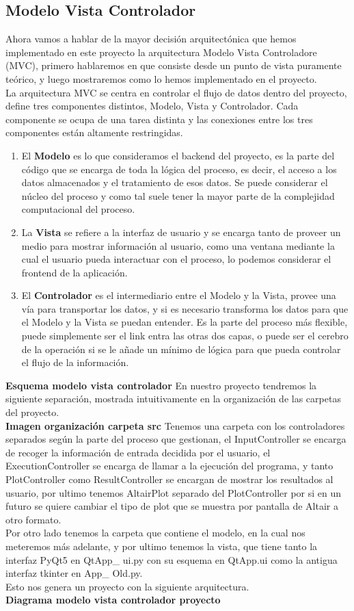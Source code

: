 \documentclass[12pt,a4paper]{article}
\begin{document}
	\subsection{Modelo Vista Controlador}
	Ahora vamos a hablar de la mayor decisión arquitectónica que hemos implementado en este proyecto la arquitectura Modelo Vista Controladore (MVC), primero hablaremos en que consiste desde un punto de vista puramente teórico, y luego mostraremos como lo hemos implementado en el proyecto.\\
	La arquitectura MVC se centra en controlar el flujo de datos dentro del proyecto, define tres componentes distintos, Modelo, Vista y Controlador. Cada componente se ocupa de una tarea distinta y las conexiones entre los tres componentes están altamente restringidas.
	\begin{enumerate}
	\item El \textbf{Modelo} es lo que consideramos el backend del proyecto, es la parte del código que se encarga de toda la lógica del proceso, es decir, el acceso a los datos almacenados y el tratamiento de esos datos. Se puede considerar el núcleo del proceso y como tal suele tener la mayor parte de la complejidad computacional del proceso.
	\item La \textbf{Vista} se refiere a la interfaz de usuario y se encarga tanto de proveer un medio para mostrar información al usuario, como una ventana mediante la cual el usuario pueda interactuar con el proceso, lo podemos considerar el frontend de la aplicación.
	\item El \textbf{Controlador} es el intermediario entre el Modelo y la Vista, provee una vía para transportar los datos, y si es necesario transforma los datos para que el Modelo y la Vista se puedan entender. Es la parte del proceso más flexible, puede simplemente ser el link entra las otras dos capas, o puede ser el cerebro de la operación si se le añade un mínimo de lógica para que pueda controlar el flujo de la información.
	\end{enumerate}
	\textbf{Esquema modelo vista controlador}
	En nuestro proyecto tendremos la siguiente separación, mostrada intuitivamente en la organización de las carpetas del proyecto.\\
	\textbf{Imagen organización carpeta src}
	Tenemos una carpeta con los controladores separados según la parte del proceso que gestionan, el InputController se encarga de recoger la información de entrada decidida por el usuario, el ExecutionController se encarga de llamar a la ejecución del programa, y tanto PlotController como ResultController se encargan de mostrar los resultados al usuario, por ultimo tenemos AltairPlot separado del PlotController por si en un futuro se quiere cambiar el tipo de plot que se muestra por pantalla de Altair a otro formato.\\
	Por otro lado tenemos la carpeta que contiene el modelo, en la cual nos meteremos más adelante, y por ultimo tenemos la vista, que tiene tanto la interfaz PyQt5 en QtApp\_ ui.py con su esquema en QtApp.ui como la antigua interfaz tkinter en App\_ Old.py.\\
	Esto nos genera un proyecto con la siguiente arquitectura.\\
	\textbf{Diagrama modelo vista controlador proyecto}
\end{document}
